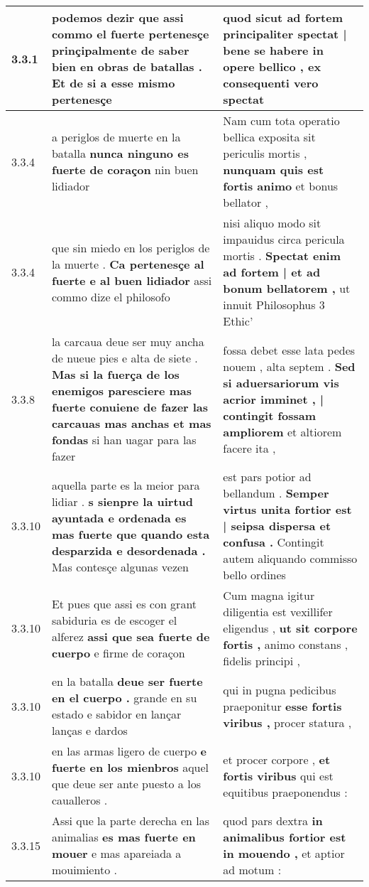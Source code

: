 \begin{tabular}{|p{1cm}|p{6.5cm}|p{6.5cm}|}
3.3.1 & podemos dezir \textbf{ que assi commo el fuerte pertenesçe prinçipalmente de saber bien en obras de batallas . } Et de si a esse mismo pertenesçe & quod sicut \textbf{ ad fortem principaliter spectat | bene se habere in opere bellico , } ex consequenti vero spectat \\\hline
3.3.4 & a periglos de muerte en la batalla \textbf{ nunca ninguno es fuerte de coraçon } nin buen lidiador & Nam cum tota operatio bellica exposita sit periculis mortis , \textbf{ nunquam quis est fortis animo } et bonus bellator , \\\hline
3.3.4 & que sin miedo en los periglos de la muerte . \textbf{ Ca pertenesçe al fuerte e al buen lidiador } assi commo dize el philosofo & nisi aliquo modo sit impauidus circa pericula mortis . \textbf{ Spectat enim ad fortem | et ad bonum bellatorem , } ut innuit Philosophus 3 Ethic’ \\\hline
3.3.8 & la carcaua deue ser muy ancha de nueue pies e alta de siete . \textbf{ Mas si la fuerça de los enemigos paresciere mas fuerte conuiene de fazer las carcauas mas anchas et mas fondas } si han uagar para las fazer & fossa debet esse lata pedes nouem , alta septem . \textbf{ Sed si aduersariorum vis acrior imminet , | contingit fossam ampliorem } et altiorem facere ita , \\\hline
3.3.10 & aquella parte es la meior para lidiar . \textbf{ s sienpre la uirtud ayuntada e ordenada es mas fuerte que quando esta desparzida e desordenada . } Mas contesçe algunas vezen & est pars potior ad bellandum . \textbf{ Semper virtus unita fortior est | seipsa dispersa et confusa . } Contingit autem aliquando commisso bello ordines \\\hline
3.3.10 & Et pues que assi es con grant sabiduria es de escoger el alferez \textbf{ assi que sea fuerte de cuerpo } e firme de coraçon & Cum magna igitur diligentia est vexillifer eligendus , \textbf{ ut sit corpore fortis , } animo constans , fidelis principi , \\\hline
3.3.10 & en la batalla \textbf{ deue ser fuerte en el cuerpo . } grande en su estado e sabidor en lançar lanças e dardos & qui in pugna pedicibus praeponitur \textbf{ esse fortis viribus , } procer statura , \\\hline
3.3.10 & en las armas ligero de cuerpo \textbf{ e fuerte en los mienbros } aquel que deue ser ante puesto a los caualleros . & et procer corpore , \textbf{ et fortis viribus } qui est equitibus praeponendus : \\\hline
3.3.15 & Assi que la parte derecha en las animalias \textbf{ es mas fuerte en mouer } e mas apareiada a mouimiento . & quod pars dextra \textbf{ in animalibus fortior est in mouendo , } et aptior ad motum : \\\hline

\end{tabular}
